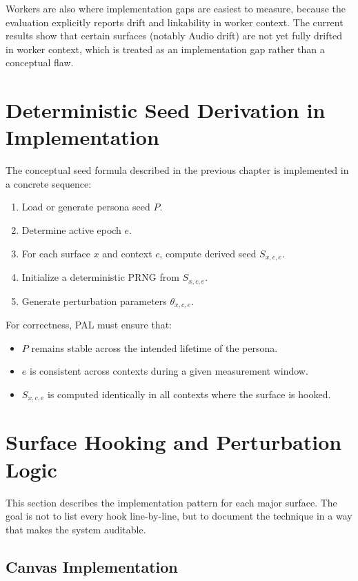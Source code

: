 \documentclass[11pt]{report}
\begin{document}
Workers are also where implementation gaps are easiest to measure, because the evaluation explicitly reports drift and linkability in worker context. The current results show that certain surfaces (notably Audio drift) are not yet fully drifted in worker context, which is treated as an implementation gap rather than a conceptual flaw.

\section{Deterministic Seed Derivation in Implementation}

The conceptual seed formula described in the previous chapter is implemented in a concrete sequence:

\begin{enumerate}
    \item Load or generate persona seed $P$.
    \item Determine active epoch $e$.
    \item For each surface $x$ and context $c$, compute derived seed $S_{x,c,e}$.
    \item Initialize a deterministic PRNG from $S_{x,c,e}$.
    \item Generate perturbation parameters $\theta_{x,c,e}$.
\end{enumerate}

For correctness, PAL must ensure that:
\begin{itemize}
    \item $P$ remains stable across the intended lifetime of the persona.
    \item $e$ is consistent across contexts during a given measurement window.
    \item $S_{x,c,e}$ is computed identically in all contexts where the surface is hooked.
\end{itemize}

\section{Surface Hooking and Perturbation Logic}

This section describes the implementation pattern for each major surface. The goal is not to list every hook line-by-line, but to document the technique in a way that makes the system auditable.

\subsection{Canvas Implementation}
\end{document}
